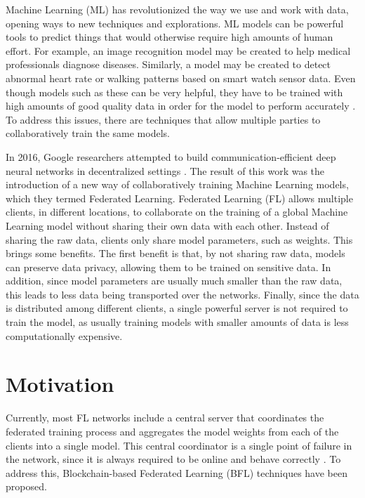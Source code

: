 Machine Learning (ML) has revolutionized the way we use and work with data, opening ways to new techniques and explorations. ML models can be powerful tools to predict things that would otherwise require high amounts of human effort. For example, an image recognition model may be created to help medical professionals diagnose diseases. Similarly, a model may be created to detect abnormal heart rate or walking patterns based on smart watch sensor data. Even though models such as these can be very helpful, they have to be trained with high amounts of good quality data in order for the model to perform accurately \cite{10.1145/3394486.3406477}. To address this issues, there are techniques that allow multiple parties to collaboratively train the same models.

In 2016, Google researchers attempted to build communication-efficient deep neural networks in decentralized settings \cite{10.48550/arxiv.1602.05629}. The result of this work was the introduction of a new way of collaboratively training Machine Learning models, which they termed Federated Learning. Federated Learning (FL) allows multiple clients, in different locations, to collaborate on the training of a global Machine Learning model without sharing their own data with each other. Instead of sharing the raw data, clients only share model parameters, such as weights. This brings some benefits. The first benefit is that, by not sharing raw data, models can preserve data privacy, allowing them to be trained on sensitive data. In addition, since model parameters are usually much smaller than the raw data, this leads to less data being transported over the networks. Finally, since the data is distributed among different clients, a single powerful server is not required to train the model, as usually training models with smaller amounts of data is less computationally expensive.

\section{Motivation}\label{intro:motivation}

Currently, most FL networks include a central server that coordinates the federated training process and aggregates the model weights from each of the clients into a single model. This central coordinator is a single point of failure in the network, since it is always required to be online and behave correctly \cite{li_blockchain_2021, 10.48550/arxiv.2110.02182}. To address this, Blockchain-based Federated Learning (BFL) techniques have been proposed.

